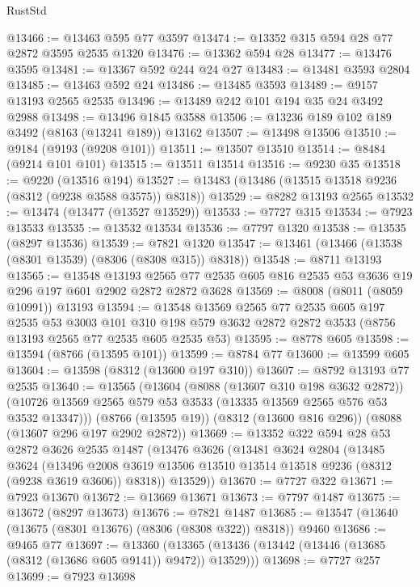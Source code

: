 \begin{lexlean}{RustStd}
\begin{coremodule}
@13466 := @13463 @595 @77 @3597
@13474 := @13352 @315 @594 @28 @77 @2872 @3595 @2535 @1320
@13476 := @13362 @594 @28
@13477 := @13476 @3595
@13481 := @13367 @592 @244 @24 @27
@13483 := @13481 @3593 @2804
@13485 := @13463 @592 @24
@13486 := @13485 @3593
@13489 := @9157 @13193 @2565 @2535
@13496 := @13489 @242 @101 @194 @35 @24 @3492 @2988
@13498 := @13496 @1845 @3588
@13506 := @13236 @189 @102 @189 @3492 (@8163 (@13241 @189)) @13162
@13507 := @13498 @13506
@13510 := @9184 (@9193 (@9208 @101))
@13511 := @13507 @13510
@13514 := @8484 (@9214 @101 @101)
@13515 := @13511 @13514
@13516 := @9230 @35
@13518 := @9220 (@13516 @194)
@13527 := @13483 (@13486 (@13515 @13518 @9236 (@8312 (@9238 @3588 @3575)) @8318))
@13529 := @8282 @13193 @2565
@13532 := @13474 (@13477 (@13527 @13529))
@13533 := @7727 @315
@13534 := @7923 @13533
@13535 := @13532 @13534
@13536 := @7797 @1320
@13538 := @13535 (@8297 @13536)
@13539 := @7821 @1320
@13547 := @13461 (@13466 (@13538 (@8301 @13539) (@8306 (@8308 @315)) @8318))
@13548 := @8711 @13193
@13565 := @13548
    @13193
    @2565
    @77
    @2535
    @605
    @816
    @2535
    @53
    @3636
    @19
    @296
    @197
    @601
    @2902
    @2872
    @2872
    @3628
@13569 := @8008 (@8011 (@8059 @10991)) @13193
@13594 := @13548
    @13569
    @2565
    @77
    @2535
    @605
    @197
    @2535
    @53
    @3003
    @101
    @310
    @198
    @579
    @3632
    @2872
    @2872
    @3533
    (@8756 @13193 @2565 @77 @2535 @605 @2535 @53)
@13595 := @8778 @605
@13598 := @13594 (@8766 (@13595 @101))
@13599 := @8784 @77
@13600 := @13599 @605
@13604 := @13598 (@8312 (@13600 @197 @310))
@13607 := @8792 @13193 @77 @2535
@13640 := @13565
    (@13604
      (@8088 (@13607 @310 @198 @3632 @2872))
      (@10726 @13569 @2565 @579 @53 @3533 (@13335 @13569 @2565 @576 @53 @3532 @13347)))
    (@8766 (@13595 @19))
    (@8312 (@13600 @816 @296))
    (@8088 (@13607 @296 @197 @2902 @2872))
@13669 := @13352
    @322
    @594
    @28
    @53
    @2872
    @3626
    @2535
    @1487
    (@13476
      @3626
      (@13481
        @3624
        @2804
        (@13485
          @3624
          (@13496 @2008 @3619 @13506 @13510 @13514 @13518 @9236 (@8312 (@9238 @3619 @3606)) @8318))
        @13529))
@13670 := @7727 @322
@13671 := @7923 @13670
@13672 := @13669 @13671
@13673 := @7797 @1487
@13675 := @13672 (@8297 @13673)
@13676 := @7821 @1487
@13685 := @13547 (@13640 (@13675 (@8301 @13676) (@8306 (@8308 @322)) @8318)) @9460
@13686 := @9465 @77
@13697 := @13360
    (@13365 (@13436 (@13442 (@13446 (@13685 (@8312 (@13686 @605 @9141)) @9472)) @13529)))
@13698 := @7727 @257
@13699 := @7923 @13698

\end{coremodule}
\end{lexlean}
